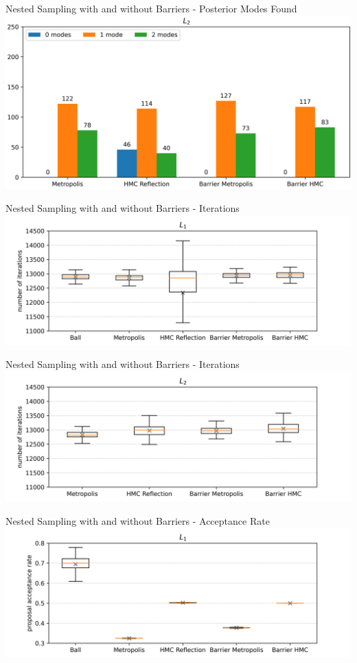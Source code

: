 \documentclass[]{beamer}
\begin{document}
  \begin{frame}{Nested Sampling with and without Barriers - Posterior Modes Found}
    \centering
    \includegraphics[scale=0.52]{figs/results/modes_found_spike_offcenter_20d.png}
  \end{frame}
  \begin{frame}{Nested Sampling with and without Barriers - Iterations}
    \centering
    \includegraphics[trim={0cm, 0cm, 1.8cm, 0cm}, clip, scale=0.6]{figs/results/iterations_spike_20d.png}
  \end{frame}
  \begin{frame}{Nested Sampling with and without Barriers - Iterations}
    \centering
    \includegraphics[trim={0cm, 0cm, 1.8cm, 0cm}, clip, scale=0.6]{figs/results/iterations_spike_offcenter_20d.png}
  \end{frame}
  \begin{frame}{Nested Sampling with and without Barriers - Acceptance Rate}
    \centering
    \includegraphics[trim={1cm, 0cm, 1.8cm, 0cm}, clip, scale=0.6]{figs/results/acceptance_rates_spike_20d.png}
  \end{frame}
\end{document}
